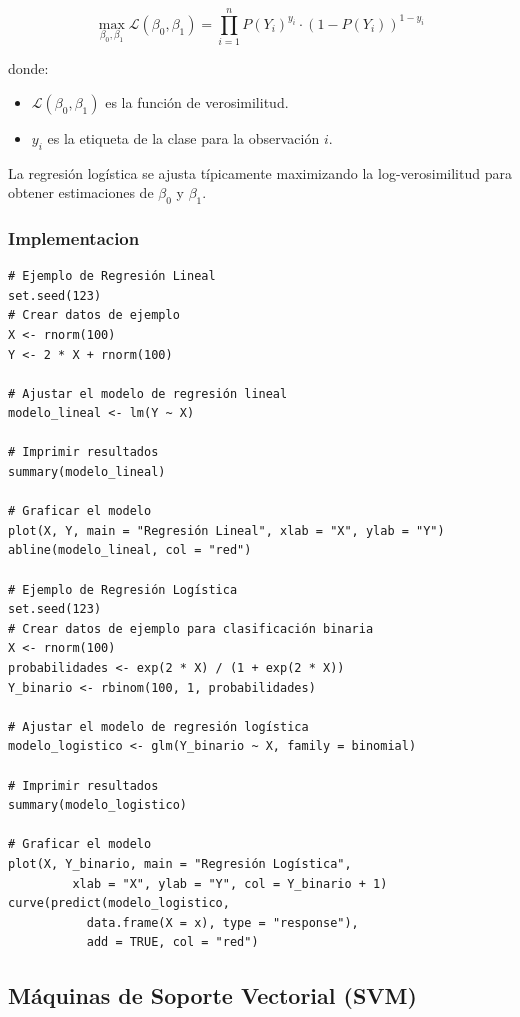 \documentclass[12pt]{article}
\begin{document}
\[
\max_{\beta_0, \beta_1} \mathcal{L}(\beta_0, \beta_1) = \prod_{i=1}^{n} P(Y_i)^{y_i} \cdot (1 - P(Y_i))^{1 - y_i}
\]

donde:
\begin{itemize}
    \item \(\mathcal{L}(\beta_0, \beta_1)\) es la función de verosimilitud.
    \item \(y_i\) es la etiqueta de la clase para la observación \(i\).
\end{itemize}

La regresión logística se ajusta típicamente maximizando la log-verosimilitud para obtener estimaciones de \(\beta_0\) y \(\beta_1\).

\subsubsection{Implementacion}
\begin{verbatim}
# Ejemplo de Regresión Lineal
set.seed(123)
# Crear datos de ejemplo
X <- rnorm(100)
Y <- 2 * X + rnorm(100)

# Ajustar el modelo de regresión lineal
modelo_lineal <- lm(Y ~ X)

# Imprimir resultados
summary(modelo_lineal)

# Graficar el modelo
plot(X, Y, main = "Regresión Lineal", xlab = "X", ylab = "Y")
abline(modelo_lineal, col = "red")

# Ejemplo de Regresión Logística
set.seed(123)
# Crear datos de ejemplo para clasificación binaria
X <- rnorm(100)
probabilidades <- exp(2 * X) / (1 + exp(2 * X))
Y_binario <- rbinom(100, 1, probabilidades)

# Ajustar el modelo de regresión logística
modelo_logistico <- glm(Y_binario ~ X, family = binomial)

# Imprimir resultados
summary(modelo_logistico)

# Graficar el modelo
plot(X, Y_binario, main = "Regresión Logística", 
         xlab = "X", ylab = "Y", col = Y_binario + 1)
curve(predict(modelo_logistico, 
           data.frame(X = x), type = "response"), 
           add = TRUE, col = "red")
\end{verbatim}


\subsection{Máquinas de Soporte Vectorial (SVM)}
\end{document}
